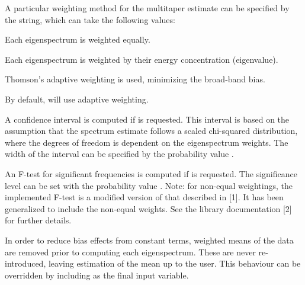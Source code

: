 A particular weighting method for the multitaper estimate can be specified by the  string, which can take the following values:
\begin{texitable}
    \item[\var{'equal'}] Each eigenspectrum is weighted equally.
    \item[\var{'eigen'}] Each eigenspectrum is weighted by their energy concentration (eigenvalue).
    \item[\var{'adapt'}] Thomson's adaptive weighting is used, minimizing the broad-band bias.
\end{texitable}
By default,  will use adaptive weighting.

A confidence interval is computed if  is requested.  This interval is based on the assumption that the spectrum estimate follows a scaled chi-squared distribution, where the degrees of freedom is dependent on the eigenspectrum weights.  The width of the interval can be specified by the probability value .

An F-test for significant frequencies is computed if  is requested.  The significance level can be set with the probability value .  Note: for non-equal weightings, the implemented F-test is a modified version of that described in [1].  It has been generalized to include the non-equal weights. See the  library documentation [2] for further details.

In order to reduce bias effects from constant terms, weighted means of the data are removed prior to computing each eigenspectrum.  These are never re-introduced, leaving estimation of the mean up to the user.  This behaviour can be overridden by including  as the final input variable.
\bigskip

